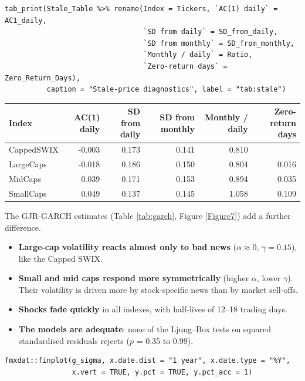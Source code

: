 \documentclass[11pt,preprint]{elsarticle}
\let\origtable\table
\let\endorigtable\endtable
\renewenvironment{table}[1][2] {
    \expandafter\origtable\expandafter[H]
} {
    \endorigtable
}
\numberwithin{equation}{section}
\numberwithin{figure}{section}
\numberwithin{table}{section}
\def\tightlist{} %
\begin{document}
\begin{verbatim}
tab_print(Stale_Table %>% rename(Index = Tickers, `AC(1) daily` = AC1_daily,
                                 `SD from daily` = SD_from_daily,
                                 `SD from monthly` = SD_from_monthly,
                                 `Monthly / daily` = Ratio,
                                 `Zero-return days` = Zero_Return_Days),
          caption = "Stale-price diagnostics", label = "tab:stale")
\end{verbatim}

\begin{table}[!htbp]
\centering
\caption{Stale-price diagnostics} 
\label{tab:stale}
\begingroup\footnotesize
\begin{tabular}{lrrrrr}
  \hline
Index & AC(1) daily & SD from daily & SD from monthly & Monthly / daily & Zero-return days \\ 
  \hline
CappedSWIX & -0.003 & 0.173 & 0.141 & 0.810 &  \\ 
  LargeCaps & -0.018 & 0.186 & 0.150 & 0.804 & 0.016 \\ 
  MidCaps & 0.039 & 0.171 & 0.153 & 0.894 & 0.035 \\ 
  SmallCaps & 0.049 & 0.137 & 0.145 & 1.058 & 0.109 \\ 
   \hline
\end{tabular}
\endgroup
\end{table}

The GJR-GARCH estimates (Table \ref{tab:garch}, Figure \ref{Figure7})
add a further difference.

\begin{itemize}
\tightlist
\item
  \textbf{Large-cap volatility reacts almost only to bad news}
  (\(\alpha \approx 0\), \(\gamma = 0.15\)), like the Capped SWIX.
\item
  \textbf{Small and mid caps respond more symmetrically} (higher
  \(\alpha\), lower \(\gamma\)). Their volatility is driven more by
  stock-specific news than by market sell-offs.
\item
  \textbf{Shocks fade quickly} in all indexes, with half-lives of 12--18
  trading days.
\item
  \textbf{The models are adequate}: none of the Ljung--Box tests on
  squared standardised residuals rejects (\(p\) = 0.35 to 0.99).
\end{itemize}

\begin{verbatim}
fmxdat::finplot(g_sigma, x.date.dist = "1 year", x.date.type = "%Y",
                x.vert = TRUE, y.pct = TRUE, y.pct_acc = 1)
\end{verbatim}
\end{document}
